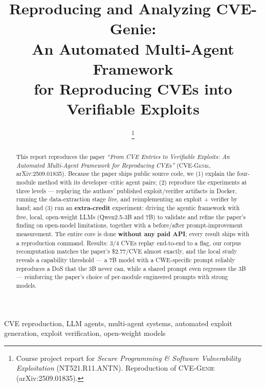 \documentclass[conference,10pt,a4paper]{IEEEtran}
\begin{document}
\title{Reproducing and Analyzing CVE-G\lowercase{enie}:\\ An Automated Multi-Agent Framework\\ for Reproducing CVEs into Verifiable Exploits}

\author{
\thanks{Course project report for \textit{Secure Programming \& Software Vulnerability Exploitation} (NT521.R11.ANTN). Reproduction of CVE-G\textsc{enie} (arXiv:2509.01835).}}

\maketitle

\begin{abstract}
This report reproduces the paper \textit{``From CVE Entries to Verifiable Exploits: An Automated Multi-Agent Framework for Reproducing CVEs''} (CVE-G\textsc{enie}, arXiv:2509.01835). Because the paper ships public source code, we (1) explain the four-module method with its developer--critic agent pairs; (2) reproduce the experiments at three levels --- replaying the authors' published exploit/verifier artifacts in Docker, running the data-extraction stage \textit{live}, and reimplementing an exploit + verifier by hand; and (3) run an \textbf{extra-credit} experiment: driving the agentic framework with free, local, open-weight LLMs (Qwen2.5-3B and 7B) to validate and refine the paper's finding on open-model limitations, together with a before/after prompt-improvement measurement. The entire core is done \textbf{without any paid API}; every result ships with a reproduction command. Results: 3/4 CVEs replay end-to-end to a flag, our corpus recomputation matches the paper's \$2.77/CVE almost exactly, and the local study reveals a capability threshold --- a 7B model with a CWE-specific prompt reliably reproduces a DoS that the 3B never can, while a shared prompt even regresses the 3B --- reinforcing the paper's choice of per-module engineered prompts with strong models.
\end{abstract}

\begin{IEEEkeywords}
CVE reproduction, LLM agents, multi-agent systems, automated exploit generation, exploit verification, open-weight models
\end{IEEEkeywords}
\end{document}
